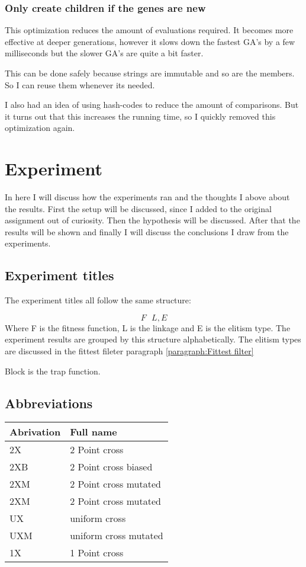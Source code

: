 \documentclass{article}
\begin{document}
\begin{empfile}
\subsubsection{Only create children if the genes are new}
This optimization reduces the amount of evaluations required.  It becomes 
more effective at deeper generations, however it slows down the fastest 
GA's by a few milliseconds but the slower GA's  are quite a bit faster.

This can be done safely because strings are immutable and so are the members.
So I can reuse them whenever its needed.

I also had an idea of using hash-codes to reduce the amount of comparisons.
But it turns out that this increases the running time, so I quickly removed
this optimization again.

\section{Experiment}
In here I will discuss how the experiments ran and the thoughts I
above about the results.
First the setup will be discussed, since I added to the
original assignment out of curiosity. Then the hypothesis
will be discussed. After that the results will be shown
and finally I will discuss the conclusions I draw from the experiments.

\subsection{Experiment titles}
The experiment titles all follow the same structure:

\[F\mbox{ }L, E\]
Where F is the fitness function, L is the linkage and E is the elitism type.
The experiment results are grouped by this structure alphabetically.
The elitism types are discussed in the fittest fileter paragraph \ref{paragraph:Fittest filter}

Block is the trap function.

\subsection{Abbreviations}
\begin{tabular}{ll}
	Abrivation & Full name \\ \toprule
	2X & 2 Point cross \\
	2XB & 2 Point cross biased \\
	2XM & 2 Point cross mutated \\
	2XM & 2 Point cross mutated \\
	UX & uniform cross \\
	UXM & uniform cross mutated \\
	1X & 1 Point cross \\ \bottomrule
\end{tabular}


\end{empfile}
\end{document}
